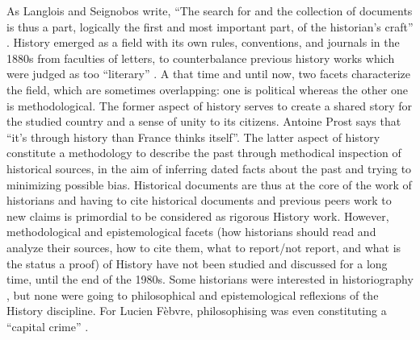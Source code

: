As Langlois and Seignobos write, ``The search for and the collection of documents is thus a part, logically the first and most important part, of the historian's craft'' \cite{langloisIntroductionAuxÉtudes2014}.
History emerged as a field with its own rules, conventions, and journals in the 1880s from faculties of letters, to counterbalance previous history works which were judged as too ``literary'' \cite{noirielNaissanceMetierHistorien1990}.
A that time and until now, two facets characterize the field, which are sometimes overlapping: one is political whereas the other one is methodological.
The former aspect of history serves to create a shared story for the studied country and a sense of unity to its citizens.
Antoine Prost says that ``it's through history than France thinks itself''\cite{prost2014}.
The latter aspect of history constitute a methodology to describe the past through methodical inspection of historical sources, in the aim of inferring dated facts about the past and trying to minimizing possible bias.
Historical documents are thus at the core of the work of historians and having to cite historical documents and previous peers work to new claims is primordial to be considered as rigorous History work.
However, methodological and epistemological facets (how historians should read and analyze their sources, how to cite them, what to report/not report, and what is the status a proof) of History have not been studied and discussed for a long time, until the end of the 1980s.
Some historians were interested in historiography \cite{carbonellHistoriographie1981}, but none were going to philosophical and epistemological reflexions of the History discipline.
For Lucien Fèbvre, philosophising was even constituting a ``capital crime'' \cite{febvreVERSAUTREHISTOIRE1949, prost2014}.

